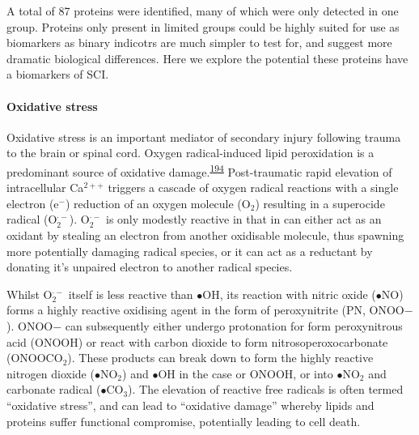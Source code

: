 \documentclass[
]{article}
\begin{document}
A total of 87 proteins were identified, many of which were only detected in one group.
Proteins only present in limited groups could be highly suited for use as biomarkers as binary indicotrs are much simpler to test for, and suggest more dramatic biological differences.
Here we explore the potential these proteins have a biomarkers of SCI.

\hypertarget{oxidative-stress}{%
\paragraph{Oxidative stress}\label{oxidative-stress}}

Oxidative stress is an important mediator of secondary injury following trauma to the brain or spinal cord.
Oxygen radical-induced lipid peroxidation is a predominant source of oxidative damage.\textsuperscript{\protect\hyperlink{ref-hall_lipid_2016}{194}}
Post-traumatic rapid elevation of intracellular Ca\(^{2++}\) triggers a cascade of oxygen radical reactions with a single electron (e\(^{-}\)) reduction of an oxygen molecule (O\(_2\)) resulting in a superocide radical (O\(_2^{\cdot -}\)).
O\(_2^{\cdot -}\) is only modestly reactive in that in can either act as an oxidant by stealing an electron from another oxidisable molecule, thus spawning more potentially damaging radical species, or it can act as a reductant by donating it's unpaired electron to another radical species.

Whilst O\(_2^{\cdot -}\) itself is less reactive than \(\bullet\)OH, its reaction with nitric oxide (\(\bullet\)NO) forms a highly reactive oxidising agent in the form of peroxynitrite (PN, ONOO\(-\)).
ONOO\(-\) can subsequently either undergo protonation for form peroxynitrous acid (ONOOH) or react with carbon dioxide to form nitrosoperoxocarbonate (ONOOCO\(_2\)).
These products can break down to form the highly reactive nitrogen dioxide (\(\bullet\)NO\(_2\)) and \(\bullet\)OH in the case or ONOOH, or into \(\bullet\)NO\(_2\) and carbonate radical (\(\bullet\)CO\(_3\)).
The elevation of reactive free radicals is often termed ``oxidative stress'', and can lead to ``oxidative damage'' whereby lipids and proteins suffer functional compromise, potentially leading to cell death.
\end{document}
